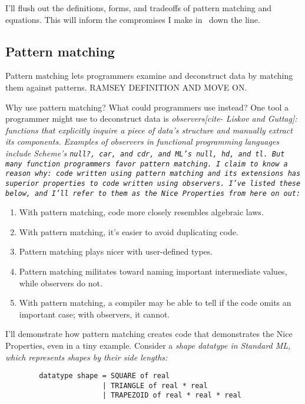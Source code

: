 \documentclass[manuscript,screen,review, 12pt, nonacm]{acmart}
\begin{document}
\begin{outline}[enumerate]
I'll flush out the definitions, forms, and tradeoffs of pattern matching and
equations. This will inform the compromises I make in \VMinus\ down the line. 

\subsection{Pattern matching}
\label{pmoverobservers}


Pattern matching lets programmers examine and deconstruct data by matching them
against patterns. RAMSEY DEFINITION AND MOVE ON. 

Why use pattern matching? What could programmers use instead? One tool a
programmer might use to deconstruct data is \it{observers}[cite- Liskov and
Guttag]: functions that explicitly inquire a piece of data's structure and
manually extract its components. Examples of observers in functional programming
languages include Scheme's \tt{null?}, \tt{car}, and \tt{cdr}, and ML's
\tt{null}, \tt{hd}, and \tt{tl}. But many function programmers favor pattern
matching. I claim to know a reason why: \it{code written using pattern matching
and its extensions has superior properties to code written using observers}.
I've listed these below, and I'll refer to them as the Nice Properties from here
on out: 

\begin{enumerate}
    \item With pattern matching, code more closely resembles algebraic laws. 
    \item With pattern matching, it's easier to avoid duplicating code.
    \item Pattern matching plays nicer with user-defined types. 
    \item Pattern matching militates toward naming important intermediate
    values, while observers do not. 
    \item With pattern matching, a compiler may be able to tell if the code
    omits an important case; with observers, it cannot. 
\end{enumerate}

I'll demonstrate how pattern matching creates code that demonstrates the Nice
Properties, even in a tiny example. Consider a \it{shape} datatype in Standard
ML, which represents shapes by their side lengths: 

\begin{minipage}[t]{\textwidth}
    \begin{verbatim}
        datatype shape = SQUARE of real 
                       | TRIANGLE of real * real 
                       | TRAPEZOID of real * real * real
\end{verbatim}
\end{minipage}


\end{outline}
\end{document}
